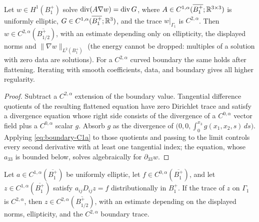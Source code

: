 \begin{theorem}
\label{thm:boundary-C2a}
Let $w\in H^1(B_1^+)$ solve $\operatorname{div}(A\nabla w)=\operatorname{div} G$, where
$A\in C^{1,\alpha}(\overline{B_1^+};\mathbb R^{3\times3})$ is uniformly elliptic,
$G\in C^{1,\alpha}(\overline{B_1^+};\mathbb R^3)$, and the trace
$w|_{\Gamma_1}$ is $C^{2,\alpha}$.  Then
$w\in C^{2,\alpha}(\overline{B_{1/2}^+})$, with an estimate depending only on
ellipticity, the displayed norms and $\|\nabla w\|_{L^2(B_1^+)}$ (the energy
cannot be dropped: multiples of a solution with zero data are solutions).  For a $C^{2,\alpha}$ curved boundary
the same holds after flattening.  Iterating with smooth coefficients, data,
and boundary gives all higher regularity.
\end{theorem}

\begin{proof}
Subtract a $C^{2,\alpha}$ extension of the boundary value.  Tangential
difference quotients of the resulting flattened equation have zero Dirichlet
trace and satisfy a divergence equation whose right side consists of the
divergence of a $C^{0,\alpha}$ vector field plus a $C^{0,\alpha}$ scalar
$g$.  Absorb $g$ as the divergence of
$\bigl(0,0,\int_0^{x_3}g(x_1,x_2,s)\,ds\bigr)$.  Applying
\eqref{eq:boundary-C1a} to those quotients and passing to the limit controls
every second derivative with at least one tangential index; the equation,
whose $a_{33}$ is bounded below, solves algebraically for $\partial_{33}w$.
\end{proof}

\begin{theorem}
\label{thm:boundary-nondiv}
Let $a\in C^{1,\alpha}(\overline{B_1^+})$ be uniformly elliptic, let
$f\in C^{0,\alpha}(\overline{B_1^+})$, and let
$z\in C^{1,\alpha}(\overline{B_1^+})$ satisfy
$a_{ij}D_{ij}z=f$ distributionally in $B_1^+$.  If the trace of $z$ on
$\Gamma_1$ is $C^{2,\alpha}$, then
$z\in C^{2,\alpha}(\overline{B_{1/2}^+})$, with an estimate depending on the
displayed norms, ellipticity, and the $C^{2,\alpha}$ boundary trace.
\end{theorem}

